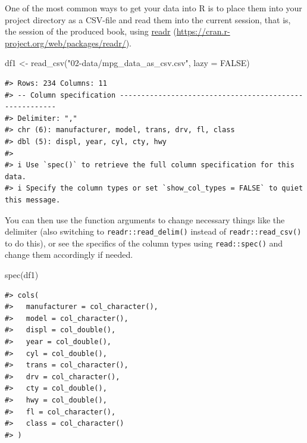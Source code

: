 \documentclass[
  11pt,
  a4paper,
  twoside]{scrbook}
\newenvironment{Shaded}{\begin{snugshade}}{\end{snugshade}}
\newcommand{\AttributeTok}[1]{\textcolor[rgb]{0.77,0.63,0.00}{#1}}
\newcommand{\ConstantTok}[1]{\textcolor[rgb]{0.00,0.00,0.00}{#1}}
\newcommand{\FunctionTok}[1]{\textcolor[rgb]{0.00,0.00,0.00}{#1}}
\newcommand{\NormalTok}[1]{#1}
\newcommand{\OtherTok}[1]{\textcolor[rgb]{0.56,0.35,0.01}{#1}}
\newcommand{\StringTok}[1]{\textcolor[rgb]{0.31,0.60,0.02}{#1}}
\begin{document}
One of the most common ways to get your data into R is to place them into your project directory as a CSV-file and read them into the current session, that is, the session of the produced book, using \href{https://cran.r-project.org/web/packages/readr/}{readr} (\url{https://cran.r-project.org/web/packages/readr/}).

\linespread{1}

\begin{Shaded}
\begin{Highlighting}[]
\NormalTok{df1 }\OtherTok{\textless{}{-}} \FunctionTok{read\_csv}\NormalTok{(}\StringTok{"02{-}data/mpg\_data\_as\_csv.csv"}\NormalTok{, }\AttributeTok{lazy =} \ConstantTok{FALSE}\NormalTok{)}
\end{Highlighting}
\end{Shaded}

\linespread{1}

\begin{verbatim}
#> Rows: 234 Columns: 11
#> -- Column specification -------------------------------------------------------
#> Delimiter: ","
#> chr (6): manufacturer, model, trans, drv, fl, class
#> dbl (5): displ, year, cyl, cty, hwy
#> 
#> i Use `spec()` to retrieve the full column specification for this data.
#> i Specify the column types or set `show_col_types = FALSE` to quiet this message.
\end{verbatim}

You can then use the function arguments to change necessary things like the delimiter (also switching to \texttt{readr::read\_delim()} instead of \texttt{readr::read\_csv()} to do this), or see the specifics of the column types using \texttt{read::spec()} and change them accordingly if needed.

\linespread{1}

\begin{Shaded}
\begin{Highlighting}[]
\FunctionTok{spec}\NormalTok{(df1)}
\end{Highlighting}
\end{Shaded}

\linespread{1}

\begin{verbatim}
#> cols(
#>   manufacturer = col_character(),
#>   model = col_character(),
#>   displ = col_double(),
#>   year = col_double(),
#>   cyl = col_double(),
#>   trans = col_character(),
#>   drv = col_character(),
#>   cty = col_double(),
#>   hwy = col_double(),
#>   fl = col_character(),
#>   class = col_character()
#> )
\end{verbatim}
\end{document}
